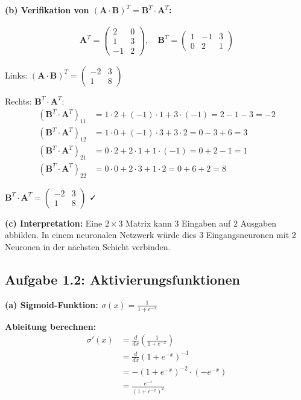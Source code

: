 \documentclass[12pt,a4paper]{article}
\begin{document}
\textbf{(b) Verifikation von $(\mathbf{A} \cdot \mathbf{B})^T = \mathbf{B}^T \cdot \mathbf{A}^T$:}

\begin{align}
\mathbf{A}^T = \begin{pmatrix} 2 & 0 \\ 1 & 3 \\ -1 & 2 \end{pmatrix}, \quad
\mathbf{B}^T = \begin{pmatrix} 1 & -1 & 3 \\ 0 & 2 & 1 \end{pmatrix}
\end{align}

Links: $(\mathbf{A} \cdot \mathbf{B})^T = \begin{pmatrix} -2 & 3 \\ 1 & 8 \end{pmatrix}$

Rechts: $\mathbf{B}^T \cdot \mathbf{A}^T$:
\begin{align}
(\mathbf{B}^T \cdot \mathbf{A}^T)_{11} &= 1 \cdot 2 + (-1) \cdot 1 + 3 \cdot (-1) = 2 - 1 - 3 = -2 \\
(\mathbf{B}^T \cdot \mathbf{A}^T)_{12} &= 1 \cdot 0 + (-1) \cdot 3 + 3 \cdot 2 = 0 - 3 + 6 = 3 \\
(\mathbf{B}^T \cdot \mathbf{A}^T)_{21} &= 0 \cdot 2 + 2 \cdot 1 + 1 \cdot (-1) = 0 + 2 - 1 = 1 \\
(\mathbf{B}^T \cdot \mathbf{A}^T)_{22} &= 0 \cdot 0 + 2 \cdot 3 + 1 \cdot 2 = 0 + 6 + 2 = 8
\end{align}

$\mathbf{B}^T \cdot \mathbf{A}^T = \begin{pmatrix} -2 & 3 \\ 1 & 8 \end{pmatrix}$ ✓

\textbf{(c) Interpretation:} Eine $2 \times 3$ Matrix kann 3 Eingaben auf 2 Ausgaben abbilden. In einem neuronalen Netzwerk würde dies 3 Eingangsneuronen mit 2 Neuronen in der nächsten Schicht verbinden.

\subsection{Aufgabe 1.2: Aktivierungsfunktionen}

\textbf{(a) Sigmoid-Funktion: $\sigma(x) = \frac{1}{1 + e^{-x}}$}

\textbf{Ableitung berechnen:}
\begin{align}
\sigma'(x) &= \frac{d}{dx}\left(\frac{1}{1 + e^{-x}}\right) \\
&= \frac{d}{dx}(1 + e^{-x})^{-1} \\
&= -(1 + e^{-x})^{-2} \cdot (-e^{-x}) \\
&= \frac{e^{-x}}{(1 + e^{-x})^2}
\end{align}
\end{document}
